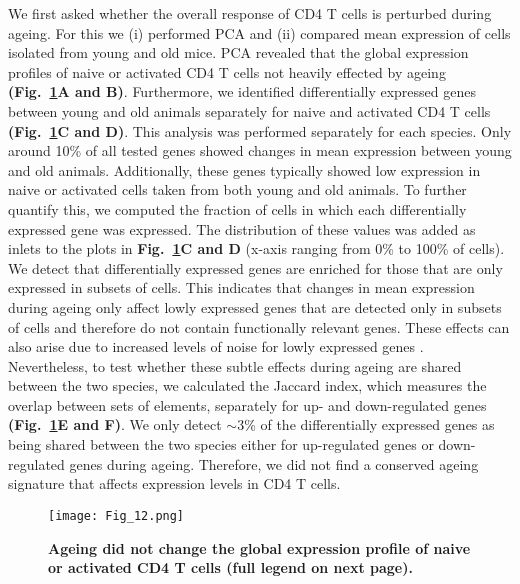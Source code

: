 We first asked whether the overall response of CD4\plus{} T cells is perturbed during ageing. For this we (i) performed PCA and (ii) compared mean expression of cells isolated from young and old mice. PCA revealed that the global expression profiles of naive or activated CD4\plus{} T cells not heavily effected by ageing \textbf{(Fig.~\ref{fig1:mean_expression_ageing}A and B)}. Furthermore, we identified differentially expressed genes between young and old animals separately for naive and activated CD4\plus{} T cells \textbf{(Fig.~\ref{fig1:mean_expression_ageing}C and D)}. This analysis was performed separately for each species. Only around 10\% of all tested genes showed changes in mean expression between young and old animals. Additionally, these genes typically showed low expression in naive or activated cells taken from both young and old animals. To further quantify this, we computed the fraction of cells in which each differentially expressed gene was expressed. The distribution of these values was added as inlets to the plots in \textbf{Fig.~\ref{fig1:mean_expression_ageing}C and D} (x-axis ranging from 0\% to 100\% of cells). We detect that differentially expressed genes are enriched for those that are only expressed in subsets of cells. This indicates that changes in mean expression during ageing only affect lowly expressed genes that are detected only in subsets of cells and therefore do not contain functionally relevant genes. These effects can also arise due to increased levels of noise for lowly expressed genes \citep{Brennecke2013}. \\

Nevertheless, to test whether these subtle effects during ageing are shared between the two species, we calculated the Jaccard index, which measures the overlap between sets of elements, separately for up- and down-regulated genes \textbf{(Fig.~\ref{fig1:mean_expression_ageing}E and F)}. We only detect $\sim$3\% of the differentially expressed genes as being shared between the two species either for up-regulated genes or down-regulated genes during ageing. Therefore, we did not find a conserved ageing signature that affects expression levels in CD4\plus{} T cells.

\newpage

\begin{figure}[!ht]
\centering
\texttt{[image: Fig\_12.png]}
\caption[Global immune response during ageing]{\textbf{Ageing did not change the global expression profile of naive or activated CD4\plus{} T cells (full legend on next page).}}
\label{fig1:mean_expression_ageing}
\end{figure}

